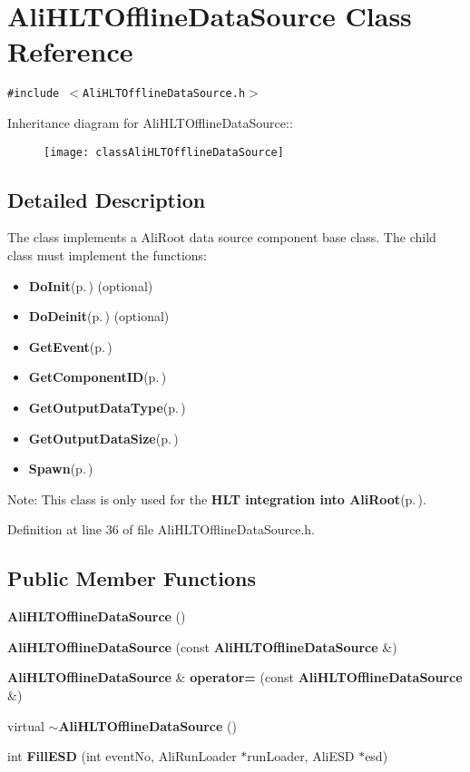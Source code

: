 \section{Ali\-HLTOffline\-Data\-Source Class Reference}
\label{classAliHLTOfflineDataSource}
{\tt \#include $<$Ali\-HLTOffline\-Data\-Source.h$>$}

Inheritance diagram for Ali\-HLTOffline\-Data\-Source::\begin{figure}[H]
\begin{center}
\leavevmode
\texttt{[image: classAliHLTOfflineDataSource]}
\end{center}
\end{figure}


\subsection{Detailed Description}
The class implements a Ali\-Root data source component base class. The child class must implement the functions:\begin{itemize}
\item {\bf Do\-Init}{\rm (p.\,\pageref{classAliHLTComponent_b5})} (optional)\item {\bf Do\-Deinit}{\rm (p.\,\pageref{classAliHLTComponent_b6})} (optional)\item {\bf Get\-Event}{\rm (p.\,\pageref{classAliHLTDataSource_d0})}\item {\bf Get\-Component\-ID}{\rm (p.\,\pageref{classAliHLTComponent_a9})}\item {\bf Get\-Output\-Data\-Type}{\rm (p.\,\pageref{classAliHLTComponent_a11})}\item {\bf Get\-Output\-Data\-Size}{\rm (p.\,\pageref{classAliHLTComponent_a12})}\item {\bf Spawn}{\rm (p.\,\pageref{classAliHLTComponent_a13})}\end{itemize}


\begin{Desc}
\item[Note:]This class is only used for the {\bf HLT integration into Ali\-Root}{\rm (p.\,\pageref{group__alihlt__system})}. \end{Desc}




Definition at line 36 of file Ali\-HLTOffline\-Data\-Source.h.\subsection*{Public Member Functions}
\begin{CompactItemize}
\item 
{\bf Ali\-HLTOffline\-Data\-Source} ()
\item 
{\bf Ali\-HLTOffline\-Data\-Source} (const {\bf Ali\-HLTOffline\-Data\-Source} \&)
\item 
{\bf Ali\-HLTOffline\-Data\-Source} \& {\bf operator=} (const {\bf Ali\-HLTOffline\-Data\-Source} \&)
\item 
virtual {\bf $\sim$Ali\-HLTOffline\-Data\-Source} ()
\item 
int {\bf Fill\-ESD} (int event\-No, Ali\-Run\-Loader $\ast$run\-Loader, Ali\-ESD $\ast$esd)
\end{CompactItemize}
